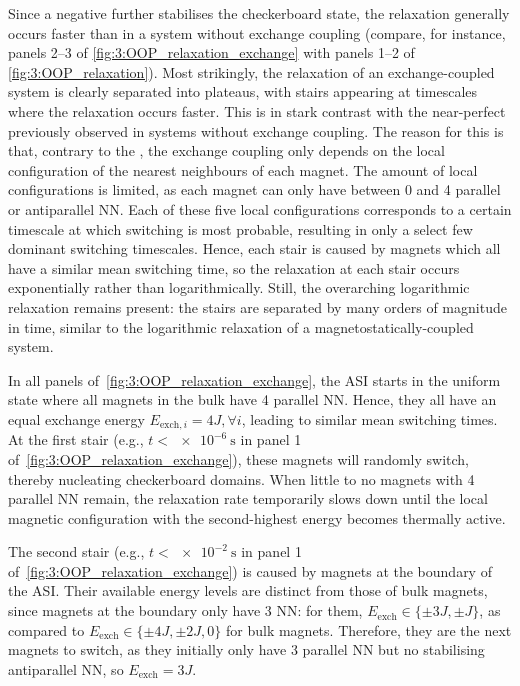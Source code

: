 Since a negative  further stabilises the checkerboard state, the relaxation generally occurs faster than in a system without exchange coupling (compare, for instance, panels 2--3 of \cref{fig:3:OOP_relaxation_exchange} with panels 1--2 of \cref{fig:3:OOP_relaxation}).
Most strikingly, the relaxation of an exchange-coupled system is clearly separated into plateaus, with stairs appearing at timescales where the relaxation occurs faster.
This is in stark contrast with the near-perfect  previously observed in systems without exchange coupling.
The reason for this is that, contrary to the , the exchange coupling only depends on the local configuration of the nearest neighbours of each magnet.
The amount of local configurations is limited, as each magnet can only have between 0 and 4 parallel or antiparallel NN.
Each of these five local configurations corresponds to a certain timescale at which switching is most probable, resulting in only a select few dominant switching timescales.
Hence, each stair is caused by magnets which all have a similar mean switching time, so the relaxation at each stair occurs exponentially rather than logarithmically.
Still, the overarching logarithmic relaxation remains present: the stairs are separated by many orders of magnitude in time, similar to the logarithmic relaxation of a magnetostatically-coupled system. \par
In all panels of~\cref{fig:3:OOP_relaxation_exchange}, the ASI starts in the uniform state where all magnets in the bulk have 4 parallel NN.
Hence, they all have an equal exchange energy $E_{\mathrm{exch},i} = 4J, \forall i$, leading to similar mean switching times.
At the first stair (e.g., $t < \SI{e-6}{\second}$ in panel 1 of~\cref{fig:3:OOP_relaxation_exchange}), these magnets will randomly switch, thereby nucleating checkerboard domains.
When little to no magnets with 4 parallel NN remain, the relaxation rate temporarily slows down until the local magnetic configuration with the second-highest energy becomes thermally active. \par
The second stair (e.g., $t < \SI{e-2}{\second}$ in panel 1 of~\cref{fig:3:OOP_relaxation_exchange}) is caused by magnets at the boundary of the ASI.
Their available energy levels are distinct from those of bulk magnets, since magnets at the boundary only have 3 NN: for them, $E_\mathrm{exch} \in \{\pm 3J, \pm J\}$, as compared to $E_\mathrm{exch} \in \{\pm 4J, \pm 2J, 0\}$ for bulk magnets.
Therefore, they are the next magnets to switch, as they initially only have 3 parallel NN but no stabilising antiparallel NN, so $E_\mathrm{exch} = 3J$.
